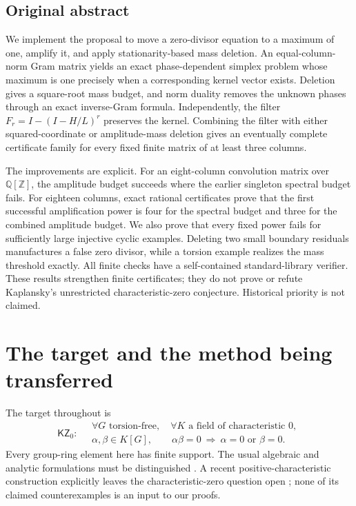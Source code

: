 \documentclass[11pt,a4paper,oneside]{report}
\theoremstyle{definition}
\theoremstyle{remark}
\newcommand{\Q}{\mathbb Q}
\newcommand{\Z}{\mathbb Z}
\newcommand{\KZ}{\mathsf{KZ}_0}
\begin{document}
\subsection*{Original abstract}
We implement the proposal to move a zero-divisor equation to a maximum
of one, amplify it, and apply stationarity-based mass deletion. An
equal-column-norm Gram matrix yields an exact phase-dependent simplex
problem whose maximum is one precisely when a corresponding kernel
vector exists. Deletion gives a square-root mass budget, and norm
duality removes the unknown phases through an exact inverse-Gram
formula. Independently, the filter
$F_r=I-(I-H/L)^r$ preserves the kernel. Combining the filter with either
squared-coordinate or amplitude-mass deletion gives an eventually
complete certificate family for every fixed finite matrix of at least
three columns.

The improvements are explicit. For an eight-column convolution matrix
over $\Q[\Z]$, the amplitude budget succeeds where the earlier
singleton spectral budget fails. For eighteen columns, exact rational
certificates prove that the first successful amplification power is
four for the spectral budget and three for the combined amplitude
budget. We also prove that every fixed power fails for sufficiently
large injective cyclic examples. Deleting two small boundary residuals
manufactures a false zero divisor, while a torsion example realizes
the mass threshold exactly. All finite checks have a self-contained
standard-library verifier. These results strengthen finite
certificates; they do not prove or refute Kaplansky's unrestricted
characteristic-zero conjecture. Historical priority is not claimed.
\medskip
\section{The target and the method being transferred}
\label{M05:sec:target}

The target throughout is
\begin{equation}\label{M05:eq:target}
\KZ:\quad
\begin{gathered}
\forall G\text{ torsion-free},\quad
\forall K\text{ a field of characteristic }0,\\
\alpha,\beta\in K[G],\qquad
\alpha\beta=0\ \Longrightarrow\ \alpha=0\text{ or }\beta=0 .
\end{gathered}
\end{equation}
Every group-ring element here has finite support. The usual
algebraic and analytic formulations must be distinguished
\cite{B:Linnell,B:Elek}. A recent positive-characteristic construction
explicitly leaves the characteristic-zero question open
\cite{B:Ivanov}; none of its claimed counterexamples is an input to
our proofs.
\end{document}
